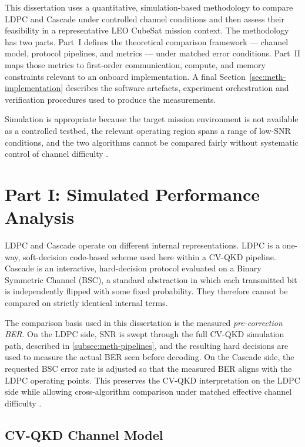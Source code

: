 \documentclass{UoYCSproject}
\begin{document}
This dissertation uses a quantitative, simulation-based methodology to compare
LDPC and Cascade under controlled channel conditions and then assess their
feasibility in a representative LEO CubeSat mission context. The methodology
has two parts. Part~I defines the theoretical comparison framework --- channel
model, protocol pipelines, and metrics --- under matched error conditions.
Part~II maps those metrics to first-order communication, compute, and memory
constraints relevant to an onboard implementation. A final
Section~\ref{sec:meth-implementation} describes the software artefacts,
experiment orchestration and verification procedures used to produce the
measurements.

Simulation is appropriate because the target mission environment is not
available as a controlled testbed, the relevant operating region spans a range
of low-SNR conditions, and the two algorithms cannot be compared fairly without
systematic control of channel difficulty
\cite{mueller_performance_2025, jordan-parra_evaluation_2024}.

\section{Part I: Simulated Performance Analysis}
\label{sec:meth-part1}

LDPC and Cascade operate on different internal representations. LDPC is a
one-way, soft-decision code-based scheme used here within a CV-QKD pipeline.
Cascade is an interactive, hard-decision protocol evaluated on a Binary
Symmetric Channel (BSC), a standard abstraction in
which each transmitted bit is independently flipped with some fixed
probability. They therefore cannot be compared on strictly identical
internal terms.

The comparison basis used in this dissertation is the measured
\textit{pre-correction BER}. On the LDPC side, SNR is swept through the full
CV-QKD simulation path, described in \ref{subsec:meth-pipelines}, and the resulting hard decisions are used to measure
the actual BER seen before decoding. On the Cascade side, the requested BSC
error rate is adjusted so that the measured BER aligns with the LDPC
operating points. This preserves the CV-QKD interpretation on the LDPC side while
allowing cross-algorithm comparison under matched effective channel difficulty
\cite{mueller_performance_2025}.

\subsection{CV-QKD Channel Model}
\label{subsec:meth-channel}
\end{document}
